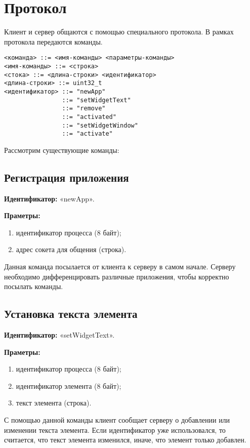 \section{Протокол}

Клиент и сервер общаются с помощью специального протокола. В рамках протокола
передаются команды.

\begin{verbatim}
<команда> ::= <имя-команды> <параметры-команды>
<имя-команды> ::= <строка>
<стока> ::= <длина-строки> <идентификатор>
<длина-строки> ::= uint32_t
<идентификатор> ::= "newApp"
                ::= "setWidgetText"
                ::= "remove"
                ::= "activated"
                ::= "setWidgetWindow"
                ::= "activate"
\end{verbatim}

Рассмотрим существующие команды:

\subsection{Регистрация приложения}

\textbf{Идентификатор:} «newApp».

\textbf{Праметры:}
\begin{enumerate}
\item идентификатор процесса (8 байт);
\item адрес сокета для общения (строка).
\end{enumerate}

Данная команда посылается от клиента к серверу в самом начале. Серверу
необходимо дифференцировать различные приложения, чтобы корректно посылать
команды.

\subsection{Установка текста элемента}

\textbf{Идентификатор:} «setWidgetText».

\textbf{Праметры:}
\begin{enumerate}
\item идентификатор процесса (8 байт);
\item идентификатор элемента (8 байт);
\item текст элемента (строка).
\end{enumerate}

С помощью данной команды клиент сообщает серверу о добавлении или изменении
текста элемента. Если идентификатор уже использовался, то считается, что текст
элемента изменился, иначе, что элемент только добавлен.

